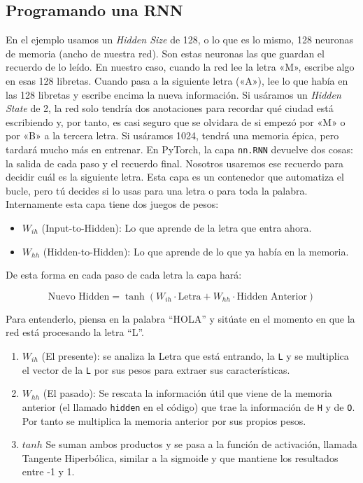 \documentclass[a4paper,11pt]{article}
\begin{document}
\subsection{Programando una RNN}

En el ejemplo usamos un \emph{Hidden Size} de 128, o lo que es lo mismo,
128 neuronas de memoria (ancho de nuestra red). Son estas neuronas las
que guardan el recuerdo de lo leído. En nuestro caso, cuando la red lee
la letra «M», escribe algo en esas 128 libretas. Cuando pasa a la
siguiente letra («A»), lee lo que había en las 128 libretas y escribe
encima la nueva información. Si usáramos un \emph{Hidden State} de 2, la
red solo tendría dos anotaciones para recordar qué ciudad está
escribiendo y, por tanto, es casi seguro que se olvidara de si empezó
por «M» o por «B» a la tercera letra. Si usáramos 1024, tendrá una
memoria épica, pero tardará mucho más en entrenar. En PyTorch, la capa
\texttt{nn.RNN} devuelve dos cosas: la salida de cada paso y el recuerdo
final. Nosotros usaremos ese recuerdo para decidir cuál es la siguiente
letra. Esta capa es un contenedor que automatiza el bucle, pero tú
decides si lo usas para una letra o para toda la palabra. Internamente
esta capa tiene dos juegos de pesos:

\begin{itemize}
\item
  \(W_{ih}\) (Input-to-Hidden): Lo que aprende de la letra que entra
  ahora.
\item
  \(W_{hh}\) (Hidden-to-Hidden): Lo que aprende de lo que ya había en la
  memoria.
\end{itemize}

De esta forma en cada paso de cada letra la capa hará:

\[
\text{Nuevo Hidden} = \tanh(W_{ih} \cdot \text{Letra} + W_{hh} \cdot \text{Hidden Anterior})
\]

Para entenderlo, piensa en la palabra ``HOLA'' y sitúate en el momento
en que la red está procesando la letra ``L''.

\begin{enumerate}
\def\labelenumi{\arabic{enumi}.}
\item
  \(W_{ih}\) (El presente): se analiza la Letra que está entrando, la
  \texttt{L} y se multiplica el vector de la \texttt{L} por sus pesos
  para extraer sus características.
\item
  \(W_{hh}\) (El pasado): Se rescata la información útil que viene de la
  memoria anterior (el llamado \texttt{hidden} en el código) que trae la
  información de \texttt{H} y de \texttt{O}. Por tanto se multiplica la
  memoria anterior por sus propios pesos.
\item
  \(tanh\) Se suman ambos productos y se pasa a la función de
  activación, llamada Tangente Hiperbólica, similar a la sigmoide y que
  mantiene los resultados entre -1 y 1.
\end{enumerate}
\end{document}
